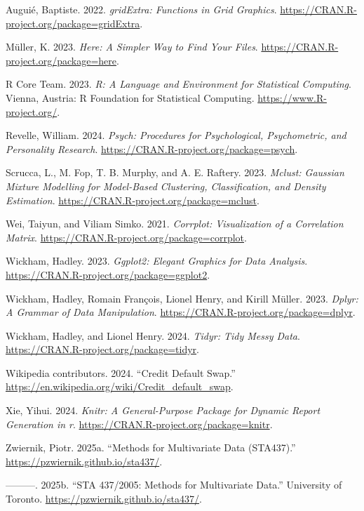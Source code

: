 \documentclass[
  letterpaper,
  DIV=11,
  numbers=noendperiod]{scrartcl}
\newlength{\cslhangindent}
\newlength{\cslentryspacingunit} %
\newenvironment{CSLReferences}[2] %
 {%
  \setlength{\parindent}{0pt}
  \ifodd #1
  \let\oldpar\par
  \def\par{\hangindent=\cslhangindent\oldpar}
  \fi
  \setlength{\parskip}{#2\cslentryspacingunit}
 }%
 {}
\begin{document}
\hypertarget{refs}{}
\begin{CSLReferences}{1}{0}
\leavevmode{}%
Auguié, Baptiste. 2022. \emph{gridExtra: Functions in Grid Graphics}.
\url{https://CRAN.R-project.org/package=gridExtra}.

\leavevmode{}%
Müller, K. 2023. \emph{Here: A Simpler Way to Find Your Files}.
\url{https://CRAN.R-project.org/package=here}.

\leavevmode{}%
R Core Team. 2023. \emph{{R: A Language and Environment for Statistical
Computing}}. Vienna, Austria: R Foundation for Statistical Computing.
\url{https://www.R-project.org/}.

\leavevmode{}%
Revelle, William. 2024. \emph{Psych: Procedures for Psychological,
Psychometric, and Personality Research}.
\url{https://CRAN.R-project.org/package=psych}.

\leavevmode{}%
Scrucca, L., M. Fop, T. B. Murphy, and A. E. Raftery. 2023.
\emph{Mclust: Gaussian Mixture Modelling for Model-Based Clustering,
Classification, and Density Estimation}.
\url{https://CRAN.R-project.org/package=mclust}.

\leavevmode{}%
Wei, Taiyun, and Viliam Simko. 2021. \emph{Corrplot: Visualization of a
Correlation Matrix}. \url{https://CRAN.R-project.org/package=corrplot}.

\leavevmode{}%
Wickham, Hadley. 2023. \emph{Ggplot2: Elegant Graphics for Data
Analysis}. \url{https://CRAN.R-project.org/package=ggplot2}.

\leavevmode{}%
Wickham, Hadley, Romain François, Lionel Henry, and Kirill Müller. 2023.
\emph{Dplyr: A Grammar of Data Manipulation}.
\url{https://CRAN.R-project.org/package=dplyr}.

\leavevmode{}%
Wickham, Hadley, and Lionel Henry. 2024. \emph{Tidyr: Tidy Messy Data}.
\url{https://CRAN.R-project.org/package=tidyr}.

\leavevmode{}%
Wikipedia contributors. 2024. {``Credit Default Swap.''}
\url{https://en.wikipedia.org/wiki/Credit_default_swap}.

\leavevmode{}%
Xie, Yihui. 2024. \emph{Knitr: A General-Purpose Package for Dynamic
Report Generation in r}. \url{https://CRAN.R-project.org/package=knitr}.

\leavevmode{}%
Zwiernik, Piotr. 2025a. {``Methods for Multivariate Data (STA437).''}
\url{https://pzwiernik.github.io/sta437/}.

\leavevmode{}%
---------. 2025b. {``{STA 437/2005: Methods for Multivariate Data}.''}
University of Toronto. \url{https://pzwiernik.github.io/sta437/}.

\end{CSLReferences}
\end{document}
